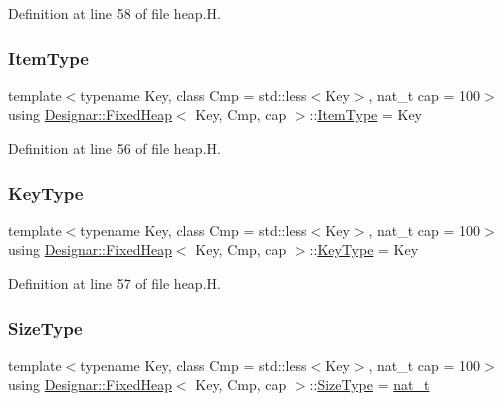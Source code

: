 Definition at line 58 of file heap.\+H.

\mbox{\label{class_designar_1_1_fixed_heap_adf444211fa73830a09b3847ebe15bc9b}} 
\subsubsection{\texorpdfstring{Item\+Type}{ItemType}}
{\footnotesize\ttfamily template$<$typename Key, class Cmp = std\+::less$<$\+Key$>$, nat\+\_\+t cap = 100$>$ \\
using \hyperlink{class_designar_1_1_fixed_heap}{Designar\+::\+Fixed\+Heap}$<$ Key, Cmp, cap $>$\+::\hyperlink{class_designar_1_1_fixed_heap_adf444211fa73830a09b3847ebe15bc9b}{Item\+Type} =  Key}



Definition at line 56 of file heap.\+H.

\mbox{\label{class_designar_1_1_fixed_heap_a2dbe3b22cba3e316803b614fba2d13e8}} 
\subsubsection{\texorpdfstring{Key\+Type}{KeyType}}
{\footnotesize\ttfamily template$<$typename Key, class Cmp = std\+::less$<$\+Key$>$, nat\+\_\+t cap = 100$>$ \\
using \hyperlink{class_designar_1_1_fixed_heap}{Designar\+::\+Fixed\+Heap}$<$ Key, Cmp, cap $>$\+::\hyperlink{class_designar_1_1_fixed_heap_a2dbe3b22cba3e316803b614fba2d13e8}{Key\+Type} =  Key}



Definition at line 57 of file heap.\+H.

\mbox{\label{class_designar_1_1_fixed_heap_a138d26dc24cbab61001f528a29b5154b}} 
\subsubsection{\texorpdfstring{Size\+Type}{SizeType}}
{\footnotesize\ttfamily template$<$typename Key, class Cmp = std\+::less$<$\+Key$>$, nat\+\_\+t cap = 100$>$ \\
using \hyperlink{class_designar_1_1_fixed_heap}{Designar\+::\+Fixed\+Heap}$<$ Key, Cmp, cap $>$\+::\hyperlink{class_designar_1_1_fixed_heap_a138d26dc24cbab61001f528a29b5154b}{Size\+Type} =  \hyperlink{namespace_designar_aa72662848b9f4815e7bf31a7cf3e33d1}{nat\+\_\+t}}




